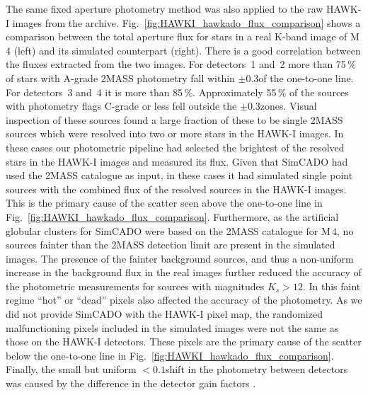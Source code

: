 The same fixed aperture photometry method was also applied to the raw HAWK-I images from the archive. Fig.~\ref{fig:HAWKI_hawkado_flux_comparison} shows a comparison between the total aperture flux for stars in a real K-band image of M\,4 (left) and its simulated counterpart (right). There is a good correlation between the fluxes extracted from the two images. For detectors~1 and~2 more than 75\,\% of stars with A-grade 2MASS photometry fall within $\pm0.3$\m of the one-to-one line. For detectors~3 and~4 it is more than 85\,\%. Approximately 55\,\% of the sources with photometry flags C-grade or less fell outside the $\pm0.3$\m zones. Visual inspection of these sources found a large fraction of these to be single 2MASS sources which were resolved into two or more stars in the HAWK-I images. In these cases our photometric pipeline had selected the brightest of the resolved stars in the HAWK-I images and measured its flux. Given that SimCADO had used the 2MASS catalogue as input, in these cases it had simulated single point sources with the combined flux of the resolved sources in the HAWK-I images. This is the primary cause of the scatter seen above the one-to-one line in Fig.~\ref{fig:HAWKI_hawkado_flux_comparison}. Furthermore, as the artificial globular clusters for SimCADO were based on the 2MASS catalogue for M\,4, no sources fainter than the 2MASS detection limit are present in the simulated images. The presence of the fainter background sources, and thus a non-uniform increase in the background flux in the real images further reduced the accuracy of the photometric measurements for sources with magnitudes $K_{s} > 12$\m. In this faint regime ``hot'' or ``dead'' pixels also affected the accuracy of the photometry. As we did not provide SimCADO with the HAWK-I pixel map, the randomized malfunctioning pixels included in the simulated images were not the same as those on the HAWK-I detectors. These pixels are the primary cause of the scatter below the one-to-one line in Fig.~\ref{fig:HAWKI_hawkado_flux_comparison}. Finally, the small but uniform $< 0.1$\m shift in the photometry between detectors was caused by the difference in the detector gain factors \citep{hawki}.

